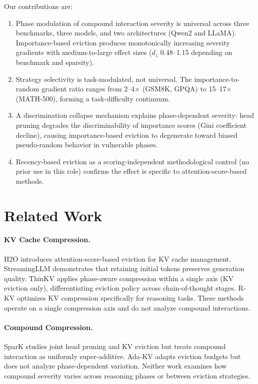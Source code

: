 \documentclass[11pt,a4paper]{article}
\begin{document}
Our contributions are:
\begin{enumerate}
    \item Phase modulation of compound interaction severity is universal across three benchmarks, three models, and two architectures (Qwen2 and LLaMA). Importance-based eviction produces monotonically increasing severity gradients with medium-to-large effect sizes ($d_z$ 0.48--1.15 depending on benchmark and sparsity).
    \item Strategy selectivity is task-modulated, not universal. The importance-to-random gradient ratio ranges from 2--4$\times$ (GSM8K, GPQA) to 15--17$\times$ (MATH-500), forming a task-difficulty continuum.
    \item A discrimination collapse mechanism explains phase-dependent severity: head pruning degrades the discriminability of importance scores (Gini coefficient decline), causing importance-based eviction to degenerate toward biased pseudo-random behavior in vulnerable phases.
    \item Recency-based eviction as a scoring-independent methodological control (no prior use in this role) confirms the effect is specific to attention-score-based methods.
\end{enumerate}

\section{Related Work}

\paragraph{KV Cache Compression.}
H2O \cite{zhang2024h2o} introduces attention-score-based eviction for KV cache management. StreamingLLM \cite{xiao2024streamingllm} demonstrates that retaining initial tokens preserves generation quality. ThinKV \cite{xu2025thinkv} applies phase-aware compression within a single axis (KV eviction only), differentiating eviction policy across chain-of-thought stages. R-KV \cite{rkv2025} optimizes KV compression specifically for reasoning tasks. These methods operate on a single compression axis and do not analyze compound interactions.

\paragraph{Compound Compression.}
SparK studies joint head pruning and KV eviction but treats compound interaction as uniformly super-additive. Ada-KV adapts eviction budgets but does not analyze phase-dependent variation. Neither work examines how compound severity varies across reasoning phases or between eviction strategies.
\end{document}
